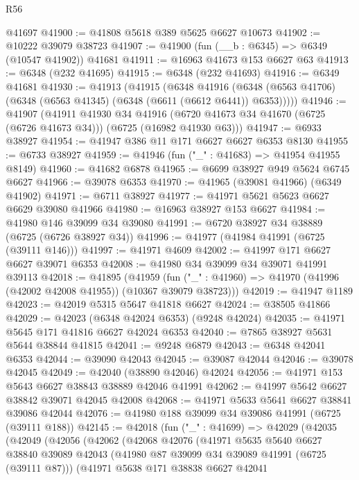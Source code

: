 \begin{lexlean}{R56}
\begin{coremodule}
    @41697
@41900 := @41808 @5618 @389 @5625 @6627 @10673
@41902 := @10222 @39079 @38723
@41907 := @41900 (fun (__b : @6345) => @6349 (@10547 @41902)) @41681
@41911 := @16963 @41673 @153 @6627 @63
@41913 := @6348 (@232 @41695)
@41915 := @6348 (@232 @41693)
@41916 := @6349 @41681
@41930 := @41913
    (@41915
      (@6348
        @41916
        (@6348 (@6563 @41706) (@6348 (@6563 @41345) (@6348 (@6611 (@6612 @6441)) @6353)))))
@41946 := @41907
    (@41911
      @41930
      @34
      @41916
      (@6720 @41673 @34 @41670 (@6725 (@6726 @41673 @34)))
      (@6725 (@16982 @41930 @63)))
@41947 := @6933 @38927
@41954 := @41947 @386 @11 @171 @6627 @6627 @6353 @8130
@41955 := @6733 @38927
@41959 := @41946 (fun ("_" : @41683) => @41954 @41955 @8149)
@41960 := @41682 @6878
@41965 := @6699 @38927 @949 @5624 @6745 @6627
@41966 := @39078 @6353
@41970 := @41965 (@39081 @41966) (@6349 @41902)
@41971 := @6711 @38927
@41977 := @41971 @5621 @5623 @6627 @6629 @39080 @41966
@41980 := @16963 @38927 @153 @6627
@41984 := @41980 @146 @39099 @34 @39080
@41991 := @6720 @38927 @34 @38889 (@6725 (@6726 @38927 @34))
@41996 := @41977 (@41984 @41991 (@6725 (@39111 @146)))
@41997 := @41971 @4609
@42002 := @41997 @171 @6627 @6627 @39071 @6353
@42008 := @41980 @34 @39099 @34 @39071 @41991 @39113
@42018 := @41895
    (@41959 (fun ("_" : @41960) => @41970 (@41996 (@42002 @42008 @41955)) (@10367 @39079 @38723)))
@42019 := @41947 @1189
@42023 := @42019 @5315 @5647 @41818 @6627
@42024 := @38505 @41866
@42029 := @42023 (@6348 @42024 @6353) (@9248 @42024)
@42035 := @41971 @5645 @171 @41816 @6627 @42024 @6353
@42040 := @7865 @38927 @5631 @5644 @38844 @41815
@42041 := @9248 @6879
@42043 := @6348 @42041 @6353
@42044 := @39090 @42043
@42045 := @39087 @42044
@42046 := @39078 @42045
@42049 := @42040 (@38890 @42046) @42024
@42056 := @41971 @153 @5643 @6627 @38843 @38889 @42046 @41991
@42062 := @41997 @5642 @6627 @38842 @39071 @42045 @42008
@42068 := @41971 @5633 @5641 @6627 @38841 @39086 @42044
@42076 := @41980 @188 @39099 @34 @39086 @41991 (@6725 (@39111 @188))
@42145 := @42018
    (fun ("_" : @41699) =>
    @42029
      (@42035
        (@42049
          (@42056
            (@42062
              (@42068
                @42076
                (@41971
                  @5635
                  @5640
                  @6627
                  @38840
                  @39089
                  @42043
                  (@41980 @87 @39099 @34 @39089 @41991 (@6725 (@39111 @87)))
                  (@41971
                    @5638
                    @171
                    @38838
                    @6627
                    @42041

\end{coremodule}
\end{lexlean}
